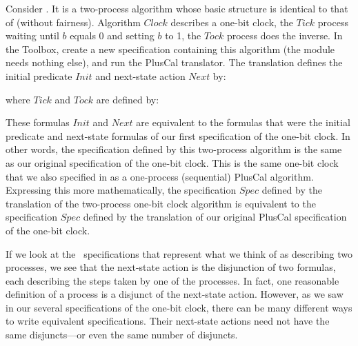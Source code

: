 \documentclass[fleqn,leqno]{article}
\begin{document}
Consider .  
It is
a two-process algorithm whose basic structure is identical to that
of 
 (without fairness).
Algorithm $Clock$ describes a one-bit clock, the $Tick$ process waiting
until $b$ equals 0 and setting $b$ to 1, the $Tock$ process does the
inverse.  In the Toolbox, create a new specification containing this
algorithm (the module needs nothing else), and run the PlusCal
translator.  The translation defines the initial predicate $Init$ and
next-state action $Next$ by:
\begin{display}
\begin{tlatex}
%
\par\vspace{8.0pt}%
%
\end{tlatex}
\end{display}
where $Tick$ and $Tock$ are defined by:
\begin{display}
\begin{tlatex}
%
%
\par\vspace{8.0pt}%
%
%
\end{tlatex}
\end{display}
These formulas $Init$ and $Next$ are equivalent to the formulas
that were the initial predicate and next-state formulas of our first
specification of the one-bit clock.  In other words, the specification
defined by this two-process algorithm is the same as our original
specification of the one-bit clock.  This is the same one-bit clock
that we also specified in
as a one-process (sequential) PlusCal algorithm.  Expressing this more
mathematically, the specification $Spec$ defined by the translation of
the two-process one-bit clock algorithm is equivalent to the
specification $Spec$ defined by the translation of our original
PlusCal specification of the one-bit clock.

If we look at the \tlaplus\ specifications that represent what we
think of as describing two processes, we see that the next-state
action is the disjunction of two formulas, each describing the steps
taken by one of the processes.  In fact, one reasonable definition of
a process is a disjunct of the next-state action.  However, as we saw
in our several specifications of the one-bit clock, there can be many
different ways to write equivalent specifications.  Their next-state
actions need not have the same disjuncts---or even the same number of
disjuncts.
\end{document}
